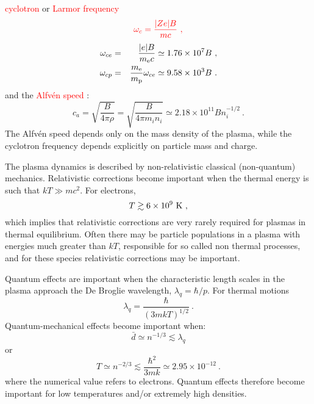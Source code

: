 \documentclass[12pt,a4paper]{article}
\begin{document}
\textcolor{red}{cyclotron} or  \textcolor{red}{Larmor frequency}
\begin{equation}
\color{red} \omega_c = \frac{|Ze| B}{mc} ~,
\end{equation}
\begin{eqnarray*}
\omega_{ce} &=&  \frac{|e| B}{m_{\rm e}c}  \simeq 1.76\times 10^7 B ~, \\
\omega_{cp} &=&  \frac{m_{\rm e}}{m_{\rm p}} \omega_{ce} \simeq 9.58\times 10^3 B ~.
\end{eqnarray*}
and the \textcolor{red}{Alfv\'en speed} :
\begin{equation}
c_a = \sqrt{\frac{B}{4\pi \rho} } = \sqrt{\frac{B}{4\pi m_i n_i} } \simeq 2.18\times 10^{11} B n_i^{-1/2} ~.
\end{equation}
The Alfv\'en speed depends only on the mass density of the plasma, while the cyclotron frequency depends explicitly on particle mass and charge.

The plasma dynamics is described by non-relativistic classical (non-quantum) mechanics. Relativistic corrections become important when the thermal energy is such that $kT \gg mc^2$. For electrons,
\begin{equation*}
T \gtrsim 6\times 10^9 ~{\rm K} ~,
\end{equation*}
which implies that relativistic corrections are very rarely required for plasmas in thermal equilibrium. Often there may be particle populations in a plasma with energies much greater than $kT$, responsible for so called non thermal processes, and for these species relativistic corrections may be important.




Quantum effects are important when the characteristic length scales in the plasma approach the De Broglie wavelength, $\lambda_q = \hbar/p$. For thermal motions 
\begin{equation*}
\lambda_q = \frac{\hbar}{(3mkT)^{1/2} } ~.
\end{equation*}
Quantum-mechanical effects become important when:
\begin{equation}
\bar{d} \simeq n^{-1/3} \lesssim \lambda_q
\end{equation}
or
\begin{equation}
T\simeq n^{-2/3} \lesssim \frac{\hbar^2}{3mk} \simeq 2.95 \times 10^{-12} ~.
\end{equation}
where the numerical value refers to electrons. Quantum effects therefore become important for low temperatures and/or extremely high densities.
\end{document}
